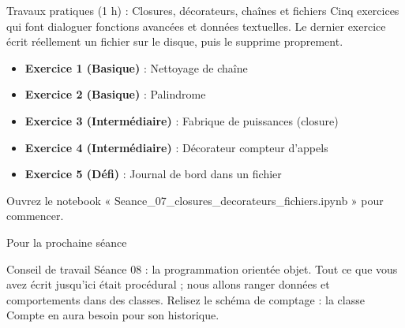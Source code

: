 \documentclass[aspectratio=169,11pt]{beamer}
\begin{document}
\begin{frame}{Travaux pratiques (1 h) : Closures, décorateurs, chaînes et fichiers}
Cinq exercices qui font dialoguer fonctions avancées et données textuelles. Le dernier exercice écrit réellement un fichier sur le disque, puis le supprime proprement.

\begin{itemize}
  \setlength{\itemsep}{1.5pt}\setlength{\parskip}{0pt}
  \item \textbf{Exercice 1 (Basique)} : Nettoyage de chaîne
  \item \textbf{Exercice 2 (Basique)} : Palindrome
  \item \textbf{Exercice 3 (Intermédiaire)} : Fabrique de puissances (closure)
  \item \textbf{Exercice 4 (Intermédiaire)} : Décorateur compteur d'appels
  \item \textbf{Exercice 5 (Défi)} : Journal de bord dans un fichier
\end{itemize}
\vspace{4pt}

{\small\color{PyGris}Ouvrez le notebook « Seance\_07\_closures\_decorateurs\_fichiers.ipynb » pour commencer.}
\end{frame}
\begin{frame}{Pour la prochaine séance}
\begin{exampleblock}{Conseil de travail}
Séance 08 : la programmation orientée objet. Tout ce que vous avez écrit jusqu'ici était procédural ; nous allons ranger données et comportements dans des classes. Relisez le schéma de comptage : la classe Compte en aura besoin pour son historique.
\end{exampleblock}
\end{frame}
\end{document}
